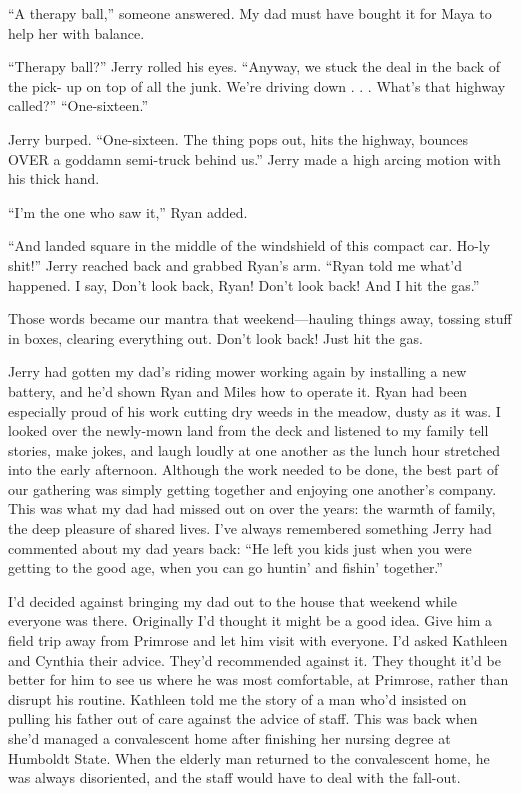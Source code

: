 \documentclass[12pt]{book}
\begin{document}
``A therapy ball,'' someone answered. My dad must have bought it for Maya to help her with balance.

``Therapy ball?'' Jerry rolled his eyes. ``Anyway, we stuck the deal in the back of the pick- up on top of all the junk. We're driving down . . . What's that highway called?'' ``One-sixteen.''

Jerry burped. ``One-sixteen. The thing pops out, hits the highway, bounces OVER a goddamn semi-truck behind us.'' Jerry made a high arcing motion with his thick hand.

``I'm the one who saw it,'' Ryan added.

``And landed square in the middle of the windshield of this compact car. Ho-ly shit!'' Jerry reached back and grabbed Ryan's arm. ``Ryan told me what'd happened. I say, Don't look back, Ryan! Don't look back! And I hit the gas.''

Those words became our mantra that weekend---hauling things away, tossing stuff in boxes, clearing everything out. Don't look back! Just hit the gas.

Jerry had gotten my dad's riding mower working again by installing a new battery, and he'd shown Ryan and Miles how to operate it. Ryan had been especially proud of his work cutting dry weeds in the meadow, dusty as it was. I looked over the newly-mown land from the deck and listened to my family tell stories, make jokes, and laugh loudly at one another as the lunch hour stretched into the early afternoon. Although the work needed to be done, the best part of our gathering was simply getting together and enjoying one another's company. This was what my dad had missed out on over the years: the warmth of family, the deep pleasure of shared lives. I've always remembered something Jerry had commented about my dad years back: ``He left you kids just when you were getting to the good age, when you can go huntin' and fishin' together.''

I'd decided against bringing my dad out to the house that weekend while everyone was there. Originally I'd thought it might be a good idea. Give him a field trip away from Primrose and let him visit with everyone. I'd asked Kathleen and Cynthia their advice. They'd recommended against it. They thought it'd be better for him to see us where he was most comfortable, at Primrose, rather than disrupt his routine. Kathleen told me the story of a man who'd insisted on pulling his father out of care against the advice of staff. This was back when she'd managed a convalescent home after finishing her nursing degree at Humboldt State. When the elderly man returned to the convalescent home, he was always disoriented, and the staff would have to deal with the fall-out.
\end{document}
